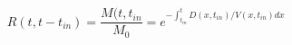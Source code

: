 \begin{equation}
R(t,t-t_{in}) = \frac{M(t,t_{in}}{M_0} = e^{-\int_{t_{in}}^t D(x,t_{in})/V(x,t_{in}) dx}
\end{equation}